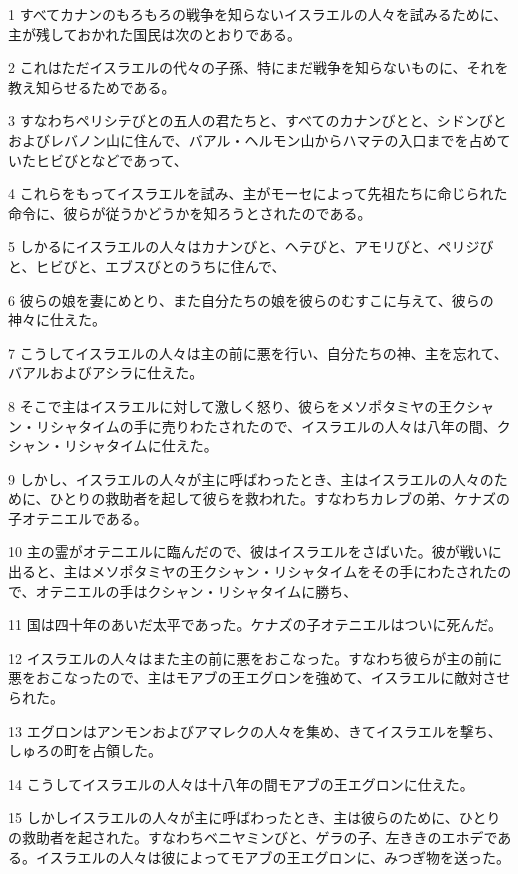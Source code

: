 \par 1 すべてカナンのもろもろの戦争を知らないイスラエルの人々を試みるために、主が残しておかれた国民は次のとおりである。
\par 2 これはただイスラエルの代々の子孫、特にまだ戦争を知らないものに、それを教え知らせるためである。
\par 3 すなわちペリシテびとの五人の君たちと、すべてのカナンびとと、シドンびとおよびレバノン山に住んで、バアル・ヘルモン山からハマテの入口までを占めていたヒビびとなどであって、
\par 4 これらをもってイスラエルを試み、主がモーセによって先祖たちに命じられた命令に、彼らが従うかどうかを知ろうとされたのである。
\par 5 しかるにイスラエルの人々はカナンびと、ヘテびと、アモリびと、ペリジびと、ヒビびと、エブスびとのうちに住んで、
\par 6 彼らの娘を妻にめとり、また自分たちの娘を彼らのむすこに与えて、彼らの神々に仕えた。
\par 7 こうしてイスラエルの人々は主の前に悪を行い、自分たちの神、主を忘れて、バアルおよびアシラに仕えた。
\par 8 そこで主はイスラエルに対して激しく怒り、彼らをメソポタミヤの王クシャン・リシャタイムの手に売りわたされたので、イスラエルの人々は八年の間、クシャン・リシャタイムに仕えた。
\par 9 しかし、イスラエルの人々が主に呼ばわったとき、主はイスラエルの人々のために、ひとりの救助者を起して彼らを救われた。すなわちカレブの弟、ケナズの子オテニエルである。
\par 10 主の霊がオテニエルに臨んだので、彼はイスラエルをさばいた。彼が戦いに出ると、主はメソポタミヤの王クシャン・リシャタイムをその手にわたされたので、オテニエルの手はクシャン・リシャタイムに勝ち、
\par 11 国は四十年のあいだ太平であった。ケナズの子オテニエルはついに死んだ。
\par 12 イスラエルの人々はまた主の前に悪をおこなった。すなわち彼らが主の前に悪をおこなったので、主はモアブの王エグロンを強めて、イスラエルに敵対させられた。
\par 13 エグロンはアンモンおよびアマレクの人々を集め、きてイスラエルを撃ち、しゅろの町を占領した。
\par 14 こうしてイスラエルの人々は十八年の間モアブの王エグロンに仕えた。
\par 15 しかしイスラエルの人々が主に呼ばわったとき、主は彼らのために、ひとりの救助者を起された。すなわちベニヤミンびと、ゲラの子、左ききのエホデである。イスラエルの人々は彼によってモアブの王エグロンに、みつぎ物を送った。
